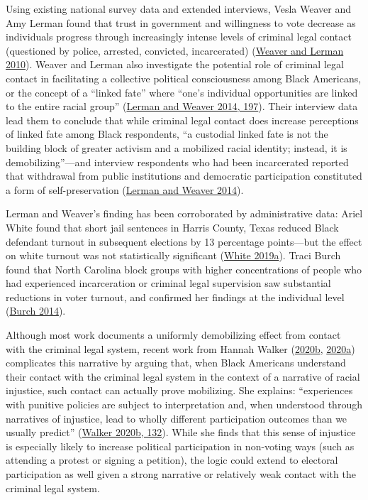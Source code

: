 \documentclass[
  12pt,
]{article}
\begin{document}
Using existing national survey data and extended interviews, Vesla Weaver and Amy Lerman found that trust in government and willingness to vote decrease as individuals progress through increasingly intense levels of criminal legal contact (questioned by police, arrested, convicted, incarcerated) (\protect\hyperlink{ref-Weaver2010}{Weaver and Lerman 2010}). Weaver and Lerman also investigate the potential role of criminal legal contact in facilitating a collective political consciousness among Black Americans, or the concept of a ``linked fate'' where ``one's individual opportunities are linked to the entire racial group'' (\protect\hyperlink{ref-Lerman2014}{Lerman and Weaver 2014, 197}). Their interview data lead them to conclude that while criminal legal contact does increase perceptions of linked fate among Black respondents, ``a custodial linked fate is not the building block of greater activism and a mobilized racial identity; instead, it is demobilizing''---and interview respondents who had been incarcerated reported that withdrawal from public institutions and democratic participation constituted a form of self-preservation (\protect\hyperlink{ref-Lerman2014}{Lerman and Weaver 2014}).

Lerman and Weaver's finding has been corroborated by administrative data: Ariel White found that short jail sentences in Harris County, Texas reduced Black defendant turnout in subsequent elections by 13 percentage points---but the effect on white turnout was not statistically significant (\protect\hyperlink{ref-White2019}{White 2019a}). Traci Burch found that North Carolina block groups with higher concentrations of people who had experienced incarceration or criminal legal supervision saw substantial reductions in voter turnout, and confirmed her findings at the individual level (\protect\hyperlink{ref-Burch2014}{Burch 2014}).

Although most work documents a uniformly demobilizing effect from contact with the criminal legal system, recent work from Hannah Walker (\protect\hyperlink{ref-Walker2020}{2020b}, \protect\hyperlink{ref-Walker2020a}{2020a}) complicates this narrative by arguing that, when Black Americans understand their contact with the criminal legal system in the context of a narrative of racial injustice, such contact can actually prove mobilizing. She explains: ``experiences with punitive policies are subject to interpretation and, when understood through narratives of injustice, lead to wholly different participation outcomes than we usually predict'' (\protect\hyperlink{ref-Walker2020}{Walker 2020b, 132}). While she finds that this sense of injustice is especially likely to increase political participation in non-voting ways (such as attending a protest or signing a petition), the logic could extend to electoral participation as well given a strong narrative or relatively weak contact with the criminal legal system.
\end{document}
